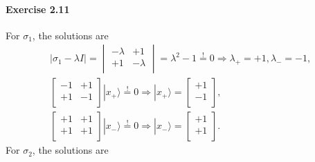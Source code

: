 \documentclass[a4paper,12pt]{article}
\newcommand{\exercise}[1]{\paragraph{Exercise #1}}
\newcommand{\ra}{\rangle}
\begin{document}
    \exercise{2.11} For $\sigma_1$, the solutions are
    \begin{gather}
        \nonumber
        | \sigma_1 - \lambda I | =
        \begin{vmatrix}
            -\lambda & +1 \\
            +1 & -\lambda \\
        \end{vmatrix} = \lambda^2 - 1 \overset{!}{=} 0 \Rightarrow \lambda_+ = +1, \lambda_- = -1 \textrm{,} \\
        \nonumber
        \begin{bmatrix}
            -1 & +1 \\
            +1 & -1 \\
        \end{bmatrix} | x_+ \ra \overset{!}{=} 0 \Rightarrow | x_+ \ra =
        \begin{bmatrix}
            +1 \\
            -1 \\
        \end{bmatrix} \textrm{,} \\
        \begin{bmatrix}
            +1 & +1 \\
            +1 & +1 \\
        \end{bmatrix} | x_- \ra \overset{!}{=} 0 \Rightarrow | x_- \ra =
        \begin{bmatrix}
            +1 \\
            +1 \\
        \end{bmatrix} \textrm{.}
    \end{gather}
    For $\sigma_2$, the solutions are
\end{document}
